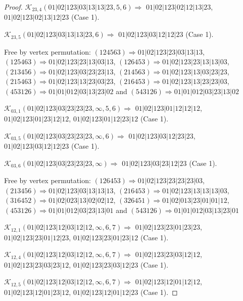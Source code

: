 \documentclass[12pt]{article}
\theoremstyle{plain}
\theoremstyle{definition}
\theoremstyle{remark}
\newcommand{\fancy}[1]{\mathcal{#1}}
\def\K{\fancy{K}}
\begin{document}
\begin{proof}
	
	
	\bigskip
	
	$\K_{23,4}(01|02|123|03|13|13|23,5, 6)\Rightarrow $ $01|02|123|02|12|13|23$, $01|02|123|02|13|12|23$ (Case 1).
	
	$\K_{23,5}(01|02|123|03|13|13|23,6)\Rightarrow $ $01|02|123|03|12|12|23$ (Case 1).
	
	
	
	Free by vertex permutation: $(1 2 4 5 6 3)\Rightarrow 01|02|123|23|03|13|13$, $(1 2 5 4 6 3)\Rightarrow 01|02|123|23|13|03|13$, $(1 2 6 4 5 3)\Rightarrow 01|02|123|23|13|13|03$, $(2 1 3 4 5 6)\Rightarrow 01|02|123|03|23|23|13$, $(2 1 4 5 6 3)\Rightarrow 01|02|123|13|03|23|23$, $(2 1 5 4 6 3)\Rightarrow 01|02|123|13|23|03|23$, $(2 1 6 4 5 3)\Rightarrow 01|02|123|13|23|23|03$, $(4 5 3 1 2 6)\Rightarrow 01|01|012|03|13|23|02$ and $(5 4 3 1 2 6)\Rightarrow 01|01|012|03|23|13|02$
	
	
	
	\bigskip
	
	$\K_{03,1}(01|02|123|03|23|23|23,\infty,5, 6)\Rightarrow $ $01|02|123|01|12|12|12$, $01|02|123|01|23|12|12$, $01|02|123|01|12|23|12$ (Case 1).
	
	$\K_{03,5}(01|02|123|03|23|23|23,\infty,6)\Rightarrow $ $01|02|123|03|12|23|23$, $01|02|123|03|12|12|23$ (Case 1).
	
	$\K_{03,6}(01|02|123|03|23|23|23,\infty)\Rightarrow $ $01|02|123|03|23|12|23$ (Case 1).
	
	
	
	Free by vertex permutation: $(1 2 6 4 5 3)\Rightarrow 01|02|123|23|23|23|03$, $(2 1 3 4 5 6)\Rightarrow 01|02|123|03|13|13|13$, $(2 1 6 4 5 3)\Rightarrow 01|02|123|13|13|13|03$, $(3 1 6 4 5 2)\Rightarrow 01|02|023|13|02|02|12$, $(3 2 6 4 5 1)\Rightarrow 01|02|013|23|01|01|12$, $(4 5 3 1 2 6)\Rightarrow 01|01|012|03|23|13|01$ and $(5 4 3 1 2 6)\Rightarrow 01|01|012|03|13|23|01$
	
	
	
	\bigskip
	
	$\K_{12,1}(01|02|123|12|03|12|12,\infty,6, 7)\Rightarrow $ $01|02|123|23|01|23|23$, $01|02|123|23|01|12|23$, $01|02|123|23|01|23|12$ (Case 1).
	
	$\K_{12,4}(01|02|123|12|03|12|12,\infty,6, 7)\Rightarrow $ $01|02|123|23|03|12|12$, $01|02|123|23|03|23|12$, $01|02|123|23|03|12|23$ (Case 1).
	
	$\K_{12,5}(01|02|123|12|03|12|12,\infty,6, 7)\Rightarrow $ $01|02|123|12|01|12|12$, $01|02|123|12|01|23|12$, $01|02|123|12|01|12|23$ (Case 1).
	

\end{proof}
\end{document}
